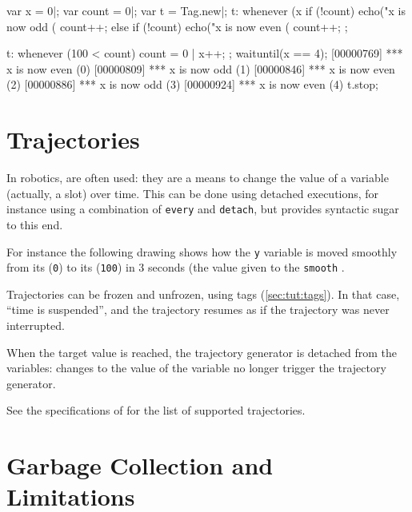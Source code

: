 \begin{urbiscript}[firstnumber=1]
var x = 0|;
var count = 0|;
var t = Tag.new|;
t:
  whenever (x %
  {
    if (!count)
      echo("x is now odd (%
    count++;
  }
  else
  {
    if (!count)
      echo("x is now even (%
    count++;
  };

t:
  whenever (100 < count)
  {
    count = 0 |
    x++;
  };
waituntil(x == 4);
[00000769] *** x is now even (0)
[00000809] *** x is now odd (1)
[00000846] *** x is now even (2)
[00000886] *** x is now odd (3)
[00000924] *** x is now even (4)
t.stop;
\end{urbiscript}



\section{Trajectories}
\label{sec:lang:traj}

In robotics,  are often used: they are a
means to change the value of a variable (actually, a slot) over time.
This can be done using detached executions, for instance using a
combination of \lstinline{every} and \lstinline{detach}, but \us
provides syntactic sugar to this end.

For instance the following drawing shows how the \lstinline{y} variable is
moved smoothly from its  (\lstinline|0|) to its
 (\lstinline|100|) in 3 seconds (the value given to the
\lstinline{smooth} .


Trajectories can be frozen and unfrozen, using tags
(\autoref{sec:tut:tags}).  In that case, ``time is suspended'', and
the trajectory resumes as if the trajectory was never interrupted.


When the target value is reached, the trajectory generator is detached
from the variables: changes to the value of the variable no longer
trigger the trajectory generator.


See the specifications of  for the list
of supported trajectories.

\section{Garbage Collection and Limitations}
\label{sec:lang:gc}

